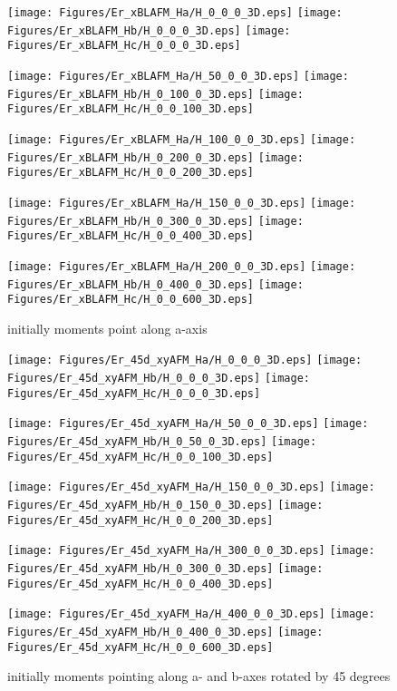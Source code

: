 \documentclass[a4paper]{article}
\begin{document}
\begin{figure}
\caption{initially moments point along a-axis}
\centering
\texttt{[image: Figures/Er\_xBLAFM\_Ha/H\_0\_0\_0\_3D.eps]}
\texttt{[image: Figures/Er\_xBLAFM\_Hb/H\_0\_0\_0\_3D.eps]}
\texttt{[image: Figures/Er\_xBLAFM\_Hc/H\_0\_0\_0\_3D.eps]}

\texttt{[image: Figures/Er\_xBLAFM\_Ha/H\_50\_0\_0\_3D.eps]}
\texttt{[image: Figures/Er\_xBLAFM\_Hb/H\_0\_100\_0\_3D.eps]}
\texttt{[image: Figures/Er\_xBLAFM\_Hc/H\_0\_0\_100\_3D.eps]}

\texttt{[image: Figures/Er\_xBLAFM\_Ha/H\_100\_0\_0\_3D.eps]}
\texttt{[image: Figures/Er\_xBLAFM\_Hb/H\_0\_200\_0\_3D.eps]}
\texttt{[image: Figures/Er\_xBLAFM\_Hc/H\_0\_0\_200\_3D.eps]}

\texttt{[image: Figures/Er\_xBLAFM\_Ha/H\_150\_0\_0\_3D.eps]}
\texttt{[image: Figures/Er\_xBLAFM\_Hb/H\_0\_300\_0\_3D.eps]}
\texttt{[image: Figures/Er\_xBLAFM\_Hc/H\_0\_0\_400\_3D.eps]}

\texttt{[image: Figures/Er\_xBLAFM\_Ha/H\_200\_0\_0\_3D.eps]}
\texttt{[image: Figures/Er\_xBLAFM\_Hb/H\_0\_400\_0\_3D.eps]}
\texttt{[image: Figures/Er\_xBLAFM\_Hc/H\_0\_0\_600\_3D.eps]}
\end{figure}

\begin{figure}
\caption{initially moments pointing along a- and b-axes rotated by 45 degrees}
\centering
\texttt{[image: Figures/Er\_45d\_xyAFM\_Ha/H\_0\_0\_0\_3D.eps]}
\texttt{[image: Figures/Er\_45d\_xyAFM\_Hb/H\_0\_0\_0\_3D.eps]}
\texttt{[image: Figures/Er\_45d\_xyAFM\_Hc/H\_0\_0\_0\_3D.eps]}

\texttt{[image: Figures/Er\_45d\_xyAFM\_Ha/H\_50\_0\_0\_3D.eps]}
\texttt{[image: Figures/Er\_45d\_xyAFM\_Hb/H\_0\_50\_0\_3D.eps]}
\texttt{[image: Figures/Er\_45d\_xyAFM\_Hc/H\_0\_0\_100\_3D.eps]}

\texttt{[image: Figures/Er\_45d\_xyAFM\_Ha/H\_150\_0\_0\_3D.eps]}
\texttt{[image: Figures/Er\_45d\_xyAFM\_Hb/H\_0\_150\_0\_3D.eps]}
\texttt{[image: Figures/Er\_45d\_xyAFM\_Hc/H\_0\_0\_200\_3D.eps]}

\texttt{[image: Figures/Er\_45d\_xyAFM\_Ha/H\_300\_0\_0\_3D.eps]}
\texttt{[image: Figures/Er\_45d\_xyAFM\_Hb/H\_0\_300\_0\_3D.eps]}
\texttt{[image: Figures/Er\_45d\_xyAFM\_Hc/H\_0\_0\_400\_3D.eps]}

\texttt{[image: Figures/Er\_45d\_xyAFM\_Ha/H\_400\_0\_0\_3D.eps]}
\texttt{[image: Figures/Er\_45d\_xyAFM\_Hb/H\_0\_400\_0\_3D.eps]}
\texttt{[image: Figures/Er\_45d\_xyAFM\_Hc/H\_0\_0\_600\_3D.eps]}
\end{figure}
\end{document}
